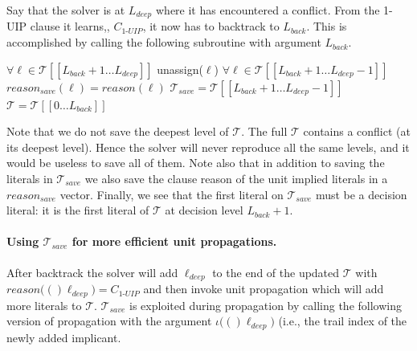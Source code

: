 \documentclass[runningheads]{llncs}
\newcommand{\trail}{\ensuremath{\mathcal{T}}}
\newcommand{\trailIdx}[1]{\ensuremath{\iota(#1)}}
\newcommand{\range}[2]{#1\ldots#2}
\newcommand{\reason}[1]{\ensuremath{\mathit{reason}(#1)}}
\newcommand{\reasonsave}[1]{\ensuremath{\mathit{reason_{\mathit{save}}(#1)}}}
\newcommand{\uipcls}{C_{\textit{1-UIP}}}
\newcommand{\deepestLvl}{L_{\textit{deep}}}
\newcommand{\deepestLit}{\ell_{\textit{deep}}}
\newcommand{\btL}{L_{\textit{back}}}
\newcommand{\trailsave}{\trail_{\mathit{save}}}
\begin{document}
Say that the solver is at $\deepestLvl$ where it has encountered a
conflict. From the 1-UIP clause it learns,, $\uipcls$, it now has to
backtrack to $\btL$. This is accomplished by calling the following
subroutine with argument $\btL$.
\begin{algorithmic}[1]
    \Procedure{backtrack}{$\btL$}
    \State $\forall \ell\in\trail[[\range{\btL{+}1}{\deepestLvl}]]$ unassign($\ell$)
    \State $\forall \ell\in\trail[[\range{\btL{+}1}{\deepestLvl{-}1}]]$ $\reasonsave{\ell} = \reason{\ell}$
    \State $\trailsave = \trail[[\range{\btL{+}1}{\deepestLvl{-}1}]]$
    \State $\trail = \trail[[\range{0}{\btL}]]$
    \EndProcedure
\end{algorithmic}

Note that we do not save the deepest level of $\trail$. The full
$\trail$ contains a conflict (at its deepest level). Hence the solver
will never reproduce all the same levels, and it would be useless to
save all of them. Note also that in addition to saving the literals in
$\trailsave$ we also save the clause reason of the unit implied
literals in a $\mathit{reason}_{save}$ vector. Finally, we see that
the first literal on $\trailsave$ must be a decision literal: it is
the first literal of $\trail$ at decision level $\btL+1$.

\paragraph{Using $\trailsave$ for more efficient unit propagations.}
After backtrack the solver will add $\deepestLit$ to the end of the
updated $\trail$ with $\reason(\deepestLit)=\uipcls$ and then invoke
unit propagation which will add more literals to
$\trail$. $\trailsave$ is exploited during propagation by calling the
following version of propagation with the argument
$\trailIdx(\deepestLit)$ (i.e., the trail index of the newly added
implicant.
\end{document}
